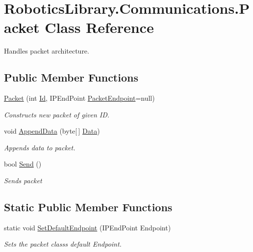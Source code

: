 \hypertarget{class_robotics_library_1_1_communications_1_1_packet}{}\section{Robotics\+Library.\+Communications.\+Packet Class Reference}
\label{class_robotics_library_1_1_communications_1_1_packet}


Handles packet architecture.  


\subsection*{Public Member Functions}
\begin{DoxyCompactItemize}
\item 
\hyperlink{class_robotics_library_1_1_communications_1_1_packet_a959df60d7fb5b840f1ac17f2558287d9}{Packet} (int \hyperlink{class_robotics_library_1_1_communications_1_1_packet_a6ed48c10bbd9b06fcb2dbd8172106728}{Id}, I\+P\+End\+Point \hyperlink{class_robotics_library_1_1_communications_1_1_packet_a394c86b3647f472f3a24837bba067338}{Packet\+Endpoint}=null)
\begin{DoxyCompactList}\small\item\em Constructs new packet of given ID. \end{DoxyCompactList}\item 
void \hyperlink{class_robotics_library_1_1_communications_1_1_packet_a047afd1596cdeb703ff7fe965a6a15ee}{Append\+Data} (byte\mbox{[}$\,$\mbox{]} \hyperlink{class_robotics_library_1_1_communications_1_1_packet_a16cae05afc6eda9dad5592095528d19a}{Data})
\begin{DoxyCompactList}\small\item\em Appends data to packet. \end{DoxyCompactList}\item 
bool \hyperlink{class_robotics_library_1_1_communications_1_1_packet_aea2ef8cc2357083a18bf3c1da0b0bdec}{Send} ()
\begin{DoxyCompactList}\small\item\em Sends packet \end{DoxyCompactList}\end{DoxyCompactItemize}
\subsection*{Static Public Member Functions}
\begin{DoxyCompactItemize}
\item 
static void \hyperlink{class_robotics_library_1_1_communications_1_1_packet_a95a0bb161aa290379b3d016b02707e93}{Set\+Default\+Endpoint} (I\+P\+End\+Point Endpoint)
\begin{DoxyCompactList}\small\item\em Sets the packet class\textquotesingle{}s default Endpoint. \end{DoxyCompactList}\end{DoxyCompactItemize}
